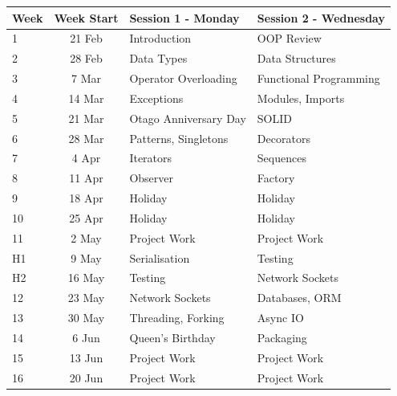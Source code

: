\documentclass{article}
\begin{document}
\renewcommand{\arraystretch}{1.5}
\begin{tabular}{|l|c|l|l|}
\hline
 Week     & Week Start & Session 1 - Monday                 & Session 2 - Wednesday   \\ \hline
 1        & 21 Feb     & Introduction                       & OOP Review              \\ \hline
 2        & 28 Feb     & Data Types                         & Data Structures         \\ \hline
 3        &  7 Mar     & Operator Overloading               & Functional Programming  \\ \hline
 4        & 14 Mar     & Exceptions                         & Modules, Imports        \\ \hline
 5        & 21 Mar     & Otago Anniversary Day              & SOLID                   \\ \hline
 6        & 28 Mar     & Patterns, Singletons               & Decorators              \\ \hline
 7        &  4 Apr     & Iterators                          & Sequences               \\ \hline
 8        & 11 Apr     & Observer                           & Factory                 \\ \hline
 9        & 18 Apr     & Holiday                            & Holiday                 \\ \hline
 10       & 25 Apr     & Holiday                            & Holiday                 \\ \hline
 11       &  2 May     & Project Work                       & Project Work            \\ \hline
 H1       &  9 May     & Serialisation                      & Testing                 \\ \hline
 H2       & 16 May     & Testing                            & Network Sockets         \\ \hline
 12       & 23 May     & Network Sockets                    & Databases, ORM          \\ \hline
 13       & 30 May     & Threading, Forking                 & Async IO                \\ \hline
 14       &  6 Jun     & Queen's Birthday                   & Packaging               \\ \hline
 15       & 13 Jun     & Project Work                       & Project Work            \\ \hline
 16       & 20 Jun     & Project Work                       & Project Work            \\ \hline
\end{tabular}
\end{document}

